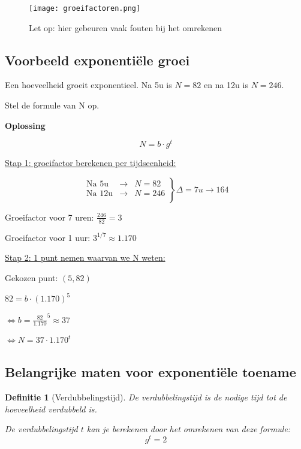 \documentclass{article}
\newtheorem{theorem}{Definitie}[section]
\begin{document}
\begin{figure}[H]
    \centering
    \texttt{[image: groeifactoren.png]}
    \caption{Let op: hier gebeuren vaak fouten bij het omrekenen}
\end{figure}

\subsection{Voorbeeld exponentiële groei}

Een hoeveelheid groeit exponentieel. Na 5u is $N = 82$ en na 12u is $N = 246$.

Stel de formule van N op.

\textbf{Oplossing}

\begin{equation*}
N = b \cdot g^t
\end{equation*}

\underline{Stap 1: groeifactor berekenen per tijdseenheid:}

\begin{center}
$$
\left.
    \begin{array}{lll}
        \text{Na 5u}  & \rightarrow & N = 82 \\
        \text{Na 12u} & \rightarrow & N = 246 \\
    \end{array}
\right \} \Delta = 7u \rightarrow 164
$$


Groeifactor voor 7 uren: $\frac{246}{82} = 3$

Groeifactor voor 1 uur: $3^{1/7} \approx 1.170$
\end{center}

\underline{Stap 2: 1 punt nemen waarvan we N weten:}

\begin{center}

Gekozen punt: $(5, 82)$

$82 = b \cdot (1.170)^5$

$\Leftrightarrow b = \frac{82}{1.170}^5 \approx 37$

$\Leftrightarrow N = 37 \cdot 1.170^t$
\end{center}

\subsection{Belangrijke maten voor exponentiële toename}


\begin{theorem}[Verdubbelingstijd]
De verdubbelingstijd is de nodige tijd tot de hoeveelheid verdubbeld is.

De verdubbelingstijd $t$ kan je berekenen door het omrekenen van deze formule:
\begin{equation}
g^t = 2
\end{equation}
\end{theorem}
\end{document}
